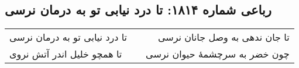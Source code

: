 \begin{center}
\section*{رباعی شماره ۱۸۱۴: تا درد نیابی تو به درمان نرسی}
\label{sec:1814}
\begin{longtable}{l p{0.5cm} r}
تا درد نیابی تو به درمان نرسی
&&
تا جان ندهی به وصل جانان نرسی
\\
تا همچو خلیل اندر آتش نروی
&&
چون خضر به سرچشمهٔ حیوان نرسی
\\
\end{longtable}
\end{center}
